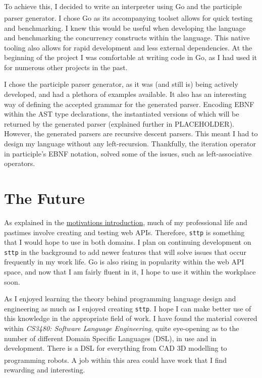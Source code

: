 \documentclass[]{full}
\theoremstyle{definition}
\begin{document}
To achieve this, I decided to write an interpreter using Go\textsuperscript{\cite{the_go_programming_language}} and the participle parser generator\textsuperscript{\cite{thomas_2021}}. I chose Go as its accompanying toolset allows for quick testing and benchmarking. I knew this would be useful when developing the language and benchmarking the concurrency constructs within the language. This native tooling also allows for rapid development and less external dependencies. At the beginning of the project I was comfortable at writing code in Go, as I had used it for numerous other projects in the past.

I chose the participle parser generator, as it was (and still is) being actively developed, and had a plethora of examples available. It also has an interesting way of defining the accepted grammar for the generated parser. Encoding EBNF within the AST type declarations, the instantiated versions of which will be returned by the generated parser (explained further in PLACEHOLDER). However, the generated parsers are recursive descent parsers. This meant I had to design my language without any left-recursion. Thankfully, the iteration operator in participle's EBNF notation, solved some of the issues, such as left-associative operators.

\section{The Future}

As explained in the \hyperref[chap:motivations]{motivations introduction}, much of my professional life and pastimes involve creating and testing web APIs. Therefore, \verb|sttp| is something that I would hope to use in both domains. I plan on continuing development on \verb|sttp| in the background to add newer features that will solve issues that occur frequently in my work life. Go is also rising in popularity within the web API space, and now that I am fairly fluent in it, I hope to use it within the workplace soon.

As I enjoyed learning the theory behind programming language design and engineering as much as I enjoyed creating \verb|sttp|. I hope I can make better use of this knowledge in the appropriate field of work. I have found the material covered within \textit{CS3480: Software Language Engineering}, quite eye-opening as to the number of different Domain Specific Languages (DSL), in use and in development. There is a DSL for everything from CAD 3D modelling to programming robots\textsuperscript{\cite{nordmann_hochgeschwender_wrede_2014}}. A job within this area could have work that I find rewarding and interesting.
\end{document}
